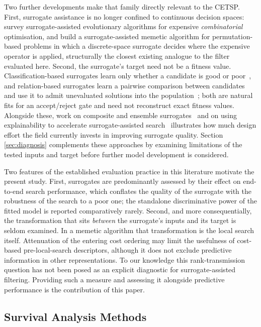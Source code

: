 \documentclass[a4paper,fleqn]{cas-dc}
\begin{document}
Two further developments make that family directly relevant to the CETSP.
First, surrogate assistance is no longer confined to continuous decision
spaces: \citet{liu2024combinatorial} survey surrogate-assisted evolutionary
algorithms for expensive \emph{combinatorial} optimisation, and
\citet{nishihara2025memetic} build a surrogate-assisted memetic algorithm for
permutation-based problems in which a discrete-space surrogate decides where the
expensive operator is applied, structurally the closest existing analogue to
the filter evaluated here. Second, the surrogate's target need not be a fitness
value. Classification-based surrogates learn only whether a candidate is good or
poor~\citep{li2022classification}, and relation-based surrogates learn a
pairwise comparison between candidates and use it to admit unevaluated solutions
into the population~\citep{hao2024unevaluated}; both are natural fits for an
accept/reject gate and need not reconstruct exact fitness values.
Alongside these, work on composite and ensemble
surrogates~\citep{zhai2024composite} and on using explainability to accelerate
surrogate-assisted search~\citep{li2024explainable} illustrates how much design
effort the field currently invests in improving surrogate quality. Section
\ref{sec:diagnosis} complements these approaches by examining limitations of
the tested inputs and target before further model development is considered.

Two features of the established evaluation practice in this literature motivate
the present study. First, surrogates are predominantly assessed by their effect
on end-to-end search performance, which conflates the quality of the surrogate
with the robustness of the search to a poor one; the standalone discriminative
power of the fitted model is reported comparatively rarely. Second, and more
consequentially, the transformation that sits \emph{between} the surrogate's
inputs and its target is seldom examined. In a memetic algorithm that
transformation is the local search itself. Attenuation of the entering cost
ordering may limit the usefulness of cost-based pre-local-search descriptors,
although it does not exclude predictive information in other representations.
To our knowledge this rank-transmission question has not been posed as an
explicit diagnostic for surrogate-assisted filtering. Providing such a measure
and assessing it alongside predictive performance is the contribution of this
paper.

\subsection{Survival Analysis Methods}\label{sec:rel-survival}
\end{document}
